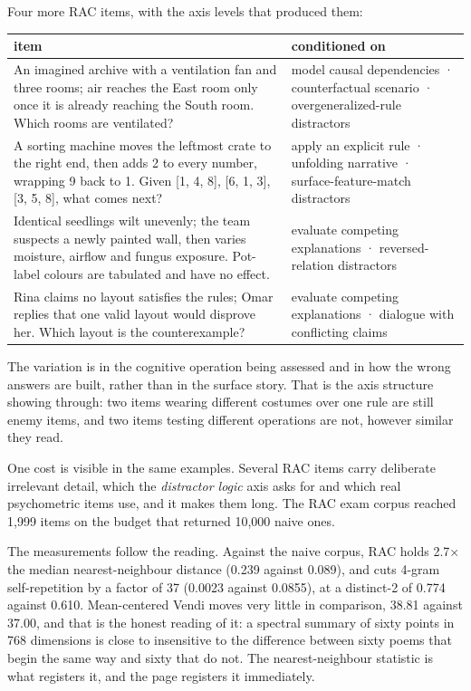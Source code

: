\documentclass[
  11pt,
]{article}
\theoremstyle{plain}
\theoremstyle{definition}
\begin{document}
Four more RAC items, with the axis levels that produced them:

\begin{longtable}[]{@{}ll@{}}
\toprule\noalign{}
item & conditioned on \\
\midrule\noalign{}
\endhead
\bottomrule\noalign{}
\endlastfoot
An imagined archive with a ventilation fan and three rooms; air reaches
the East room only once it is already reaching the South room. Which
rooms are ventilated? & model causal dependencies · counterfactual
scenario · overgeneralized-rule distractors \\
A sorting machine moves the leftmost crate to the right end, then adds 2
to every number, wrapping 9 back to 1. Given {[}1, 4, 8{]}, {[}6, 1,
3{]}, {[}3, 5, 8{]}, what comes next? & apply an explicit rule ·
unfolding narrative · surface-feature-match distractors \\
Identical seedlings wilt unevenly; the team suspects a newly painted
wall, then varies moisture, airflow and fungus exposure. Pot-label
colours are tabulated and have no effect. & evaluate competing
explanations · reversed-relation distractors \\
Rina claims no layout satisfies the rules; Omar replies that one valid
layout would disprove her. Which layout is the counterexample? &
evaluate competing explanations · dialogue with conflicting claims \\
\end{longtable}

The variation is in the cognitive operation being assessed and in how
the wrong answers are built, rather than in the surface story. That is
the axis structure showing through: two items wearing different costumes
over one rule are still enemy items, and two items testing different
operations are not, however similar they read.

One cost is visible in the same examples. Several RAC items carry
deliberate irrelevant detail, which the \emph{distractor logic} axis
asks for and which real psychometric items use, and it makes them long.
The RAC exam corpus reached 1,999 items on the budget that returned
10,000 naive ones.

The measurements follow the reading. Against the naive corpus, RAC holds
2.7× the median nearest-neighbour distance (0.239 against 0.089), and
cuts 4-gram self-repetition by a factor of 37 (0.0023 against 0.0855),
at a distinct-2 of 0.774 against 0.610. Mean-centered Vendi moves very
little in comparison, 38.81 against 37.00, and that is the honest
reading of it: a spectral summary of sixty points in 768 dimensions is
close to insensitive to the difference between sixty poems that begin
the same way and sixty that do not. The nearest-neighbour statistic is
what registers it, and the page registers it immediately.
\end{document}

